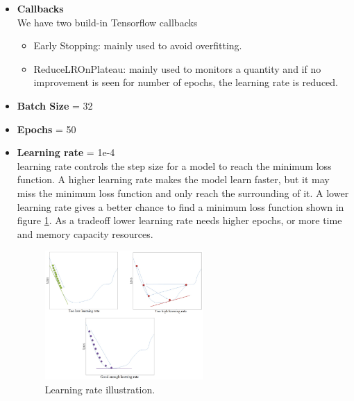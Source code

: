 \begin{itemize}[itemsep=1pt, topsep=5pt]
    \item {\textbf{Callbacks}} \\
    We have two build-in Tensorflow callbacks
    \begin{itemize}[itemsep=1pt, topsep=5pt]
        \item Early Stopping: mainly used to avoid overfitting.
        \item ReduceLROnPlateau: mainly used to monitors a quantity and if no improvement is seen for number of epochs, the learning rate is reduced.
     \end{itemize} 
    
     \item {\textbf{Batch Size} = 32}
     \item {\textbf{Epochs} = 50}
     \item {\textbf{Learning rate} = 1e-4} \\
     learning rate controls the step size for a model to reach the minimum loss function. A higher learning rate makes the model learn faster, but it may miss the minimum loss function and only reach the surrounding of it. A lower learning rate gives a better chance to find a minimum loss function shown in figure \ref{fig:lr}. As a tradeoff lower learning rate needs higher epochs, or more time and memory capacity resources.
     
     \begin{figure}[!htb]
        \centering
        \includegraphics[width=6cm]{images/lr.png}
        \caption{Learning rate illustration.}
        \label{fig:lr}
    \end{figure}
    

\end{itemize}
